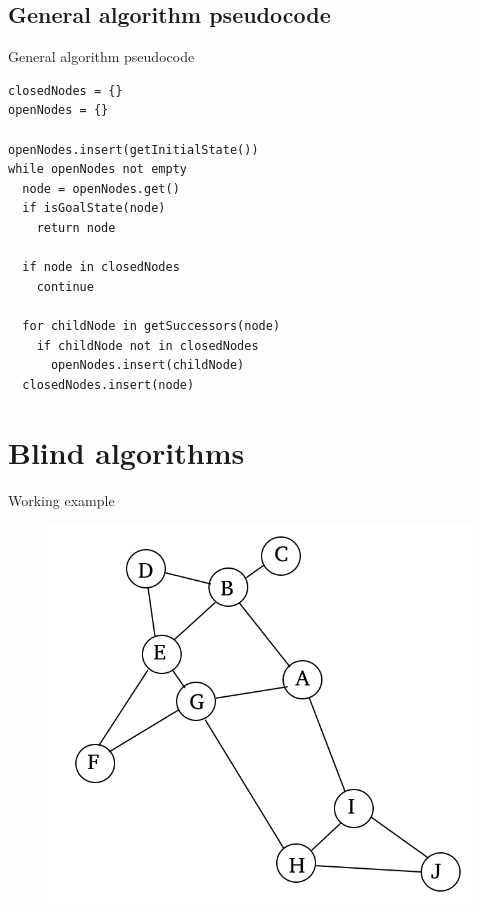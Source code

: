\documentclass{beamer}
\begin{document}
\subsection{General algorithm pseudocode}

\begin{frame}[fragile]{General algorithm pseudocode}
	\begin{lstlisting}
closedNodes = {}
openNodes = {}

openNodes.insert(getInitialState())
while openNodes not empty 
  node = openNodes.get()
  if isGoalState(node)
    return node
		
  if node in closedNodes
    continue
	
  for childNode in getSuccessors(node)
    if childNode not in closedNodes
      openNodes.insert(childNode)
  closedNodes.insert(node)
	\end{lstlisting}
\end{frame}

\section{Blind algorithms}

\begin{frame}{Working example}

	\begin{figure}
	\centering
		\includegraphics[width=0.8\linewidth]{example.jpg}
	\end{figure}

\end{frame}
\end{document}
